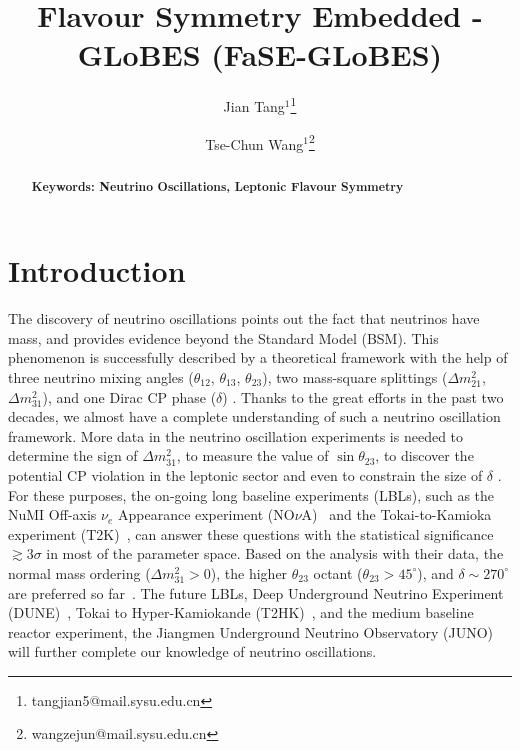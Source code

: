 \documentclass[aps,prd,nofootinbib,preprint]{revtex4}
\begin{document}
 
\title{Flavour Symmetry Embedded - GLoBES (FaSE-GLoBES)} %
\author{Jian Tang$^1$\footnote{tangjian5@mail.sysu.edu.cn}}
\author{Tse-Chun Wang$^1$\footnote{wangzejun@mail.sysu.edu.cn}}

\begin{abstract}
\textbf{Keywords: Neutrino Oscillations, Leptonic Flavour Symmetry}  
\end{abstract}

\maketitle

\section{Introduction}\label{sec:intro}

The discovery of neutrino oscillations points out the fact that neutrinos have mass, and provides evidence beyond the Standard Model (BSM). This phenomenon is successfully described by a theoretical framework with the help of three neutrino mixing angles ($\theta_{12}$, $\theta_{13}$, $\theta_{23}$), two mass-square splittings ($\Delta m_{21}^2$, $\Delta m_{31}^2$), and one Dirac CP phase ($\delta$) \cite{Pontecorvo:1967fh,Maki:1962mu,Pontecorvo:1957qd,Esteban:2018azc}. Thanks to the great efforts in the past two decades, we almost have a complete understanding of such a neutrino oscillation framework. More data in the neutrino oscillation experiments is needed to determine the sign of $\Delta m_{31}^2$, to measure the value of $\sin\theta_{23}$, to discover the potential CP violation in the leptonic sector and even to constrain the size of $\delta$ \cite{Esteban:2018azc}. For these purposes, the on-going long baseline experiments (LBLs), such as the NuMI Off-axis $\nu_e$ Appearance experiment (NO$\nu$A)~\cite{Ayres:2007tu} and the Tokai-to-Kamioka experiment (T2K)~\cite{Abe:2011ks}, can answer these questions with the statistical significance $\gtrsim 3\sigma$ in most of the parameter space. Based on the analysis with their data, the normal mass ordering ($\Delta m_{31}^2>0$), the higher $\theta_{23}$ octant ($\theta_{23}>45^\circ$), and $\delta\sim270^\circ$ are preferred so far~\cite{Esteban:2018azc}. The future LBLs, Deep Underground Neutrino Experiment (DUNE)~\cite{Acciarri:2015uup}, Tokai to Hyper-Kamiokande (T2HK)~\cite{Abe:2014oxa}, and the medium baseline reactor experiment, the Jiangmen Underground Neutrino Observatory (JUNO)~\cite{Djurcic:2015vqa,An:2015jdp} will further complete our knowledge of neutrino oscillations.
\end{document}
